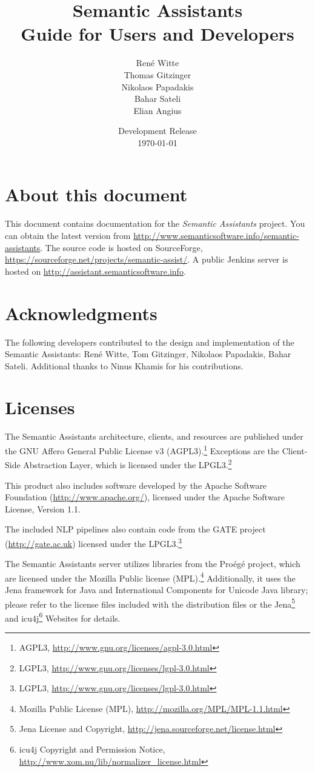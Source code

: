 \documentclass[10pt,twoside,openany,bibtotoc,liststotoc,chapterprefix]{scrbook}
\title{Semantic Assistants\bigskip\\
\Large Guide for Users and Developers}
\author{Ren\'{e} Witte\\
Thomas Gitzinger\\
Nikolaos Papadakis\\
Bahar Sateli\\
Elian Angius
\medskip}
\date{Development Release\\
\today
}
\begin{document}
\frontmatter
\maketitle

\tableofcontents

\section*{About this document}
This document contains documentation for the \emph{Semantic
  Assistants} project. You can obtain the latest version from
\url{http://www.semanticsoftware.info/semantic-assistants}. The source
code is hosted on SourceForge,
\url{https://sourceforge.net/projects/semantic-assist/}.  A public
Jenkins server is hosted on
\url{http://assistant.semanticsoftware.info}.

\section*{Acknowledgments}
The following developers contributed to the design and implementation
of the Semantic Assistants: Ren\'{e} Witte, Tom Gitzinger, Nikolaos
Papadakis, Bahar Sateli. Additional thanks to Ninus Khamis for
his contributions.

\section*{Licenses}
The Semantic Assistants architecture, clients, and resources are
published under the GNU Affero General Public License v3
(AGPL3).\footnote{AGPL3,
  \url{http://www.gnu.org/licenses/agpl-3.0.html}} Exceptions are the
Client-Side Abstraction Layer, which is licensed under the  LPGL3.\footnote{LGPL3, \url{http://www.gnu.org/licenses/lgpl-3.0.html}}

This product also includes software developed by the Apache Software
Foundation (\url{http://www.apache.org/}), licensed under the Apache
Software License, Version 1.1.

The included NLP pipelines also contain code from the GATE project
(\url{http://gate.ac.uk}) licensed under the LPGL3.\footnote{LGPL3, \url{http://www.gnu.org/licenses/lgpl-3.0.html}}

The Semantic Assistants server utilizes libraries from the Pro\'eg\'e
project, which are licensed under the Mozilla Public license
(MPL).\footnote{Mozilla Public License (MPL),
  \url{http://mozilla.org/MPL/MPL-1.1.html}} Additionally, it uses
the Jena framework for Java and International Components for Unicode Java library; please refer to the license files included with
the distribution files or the Jena\footnote{Jena License and
  Copyright, \url{http://jena.sourceforge.net/license.html}} and icu4j\footnote{icu4j Copyright and Permission Notice, \url{http://www.xom.nu/lib/normalizer_license.html}} Websites for details.
\end{document}
